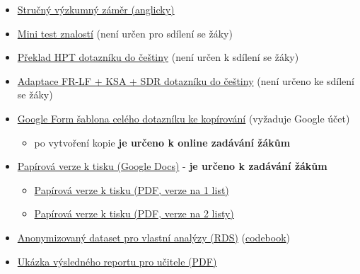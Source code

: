 \documentclass[
  12pt,
  english,
  a4paper,
  extrafontsizes,onecolumn,openright
  ]{memoir}
\providecommand{\tightlist}{%
  \setlength{\itemsep}{0pt}\setlength{\parskip}{0pt}}
\begin{document}
\begin{itemize}
\tightlist
\item
  \href{https://docs.google.com/document/d/1dVALx38nJEfqsNkWrgBRTvNikQI5fTJ3-S9JJCXsd5Q/edit?usp=sharing}{Stručný výzkumný záměr (anglicky)}
\item
  \href{https://docs.google.com/document/d/10geollT853sY61kzo2I76jjGK4XT5bYbCAtHSZfF6s8/edit?usp=sharing}{Mini test znalostí} (není určen pro sdílení se žáky)
\item
  \href{https://docs.google.com/document/d/1MdAjadyAtGVR-gfEgizH5-RXEBgc0I-cpo3qNG2VAtY/edit?usp=sharing}{Překlad HPT dotazníku do češtiny} (není určen k sdílení se žáky)
\item
  \href{https://docs.google.com/document/d/1qkEgybQVgHTRuyUbPhlDYg0_SjQLAxq9gkS4jzUj5e8/edit?usp=sharing}{Adaptace FR-LF + KSA + SDR dotazníku do češtiny} (není určeno ke sdílení se žáky)
\item
  \href{https://docs.google.com/forms/d/1cL_q5lPQ6lpoHRFE_gyXv6z8oWWou6jrpHVk1lYWTsQ/copy}{Google Form šablona celého dotazníku ke kopírování} (vyžaduje Google účet)

  \begin{itemize}
  \tightlist
  \item
    po vytvoření kopie \textbf{je určeno k online zadávání žákům}
  \end{itemize}
\item
  \href{https://docs.google.com/document/d/1oEAfcp7fBjfRQW56GQSGQ9JG2QocuZivh3VRTWBxK6U/edit?usp=sharing}{Papírová verze k tisku (Google Docs)} - \textbf{je určeno k zadávání žákům}

  \begin{itemize}
  \tightlist
  \item
    \href{https://drive.google.com/file/d/1I2cWLWs26P0-rOVmPBtnIV9M_F-htyk3/view?usp=sharing}{Papírová verze k tisku (PDF, verze na 1 list)}
  \item
    \href{https://drive.google.com/file/d/1IZKhkWbS8PiEFHFpI_FTiZxQ3RfPY8Vw/view?usp=sharing}{Papírová verze k tisku (PDF, verze na 2 listy)}
  \end{itemize}
\item
  \href{data/029-hpt-a-extremismus.RDS}{Anonymizovaný dataset pro vlastní analýzy (RDS)} (\href{data/029-hpt-a-extremismus-codebook.pdf}{codebook})
\item
  \href{data/029-hpt-a-extremismus-report.pdf}{Ukázka výsledného reportu pro učitele (PDF)}
\end{itemize}
\end{document}
